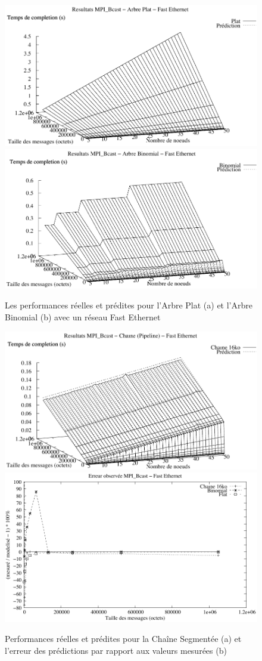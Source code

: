 \begin{figure}[h]
	\centering
	\includegraphics[width=0.5\linewidth]{images/modeles/FEth/Bcast/comp_Flat}\includegraphics[width=0.5\linewidth]{images/modeles/FEth/Bcast/comp_Binomial}
	\caption{\label{Figure:Comparison-Bcast_Flat_FEth}Les performances réelles
		et prédites pour l'Arbre Plat (a) et l'Arbre Binomial (b) avec un réseau Fast Ethernet}
\end{figure}

%
\begin{figure}[h]
	\centering
	\includegraphics[width=0.5\linewidth]{images/modeles/FEth/Bcast/comp_Chain_16384}\includegraphics[width=0.5\linewidth]{images/modeles/FEth/Bcast/error}
	\caption{\label{Figure:Comparison-Bcast-Chain_FEth}Performances réelles
		et prédites pour la Chaîne Segmentée (a)  et l'erreur des prédictions par rapport
		aux valeurs mesurées (b)}
\end{figure}

